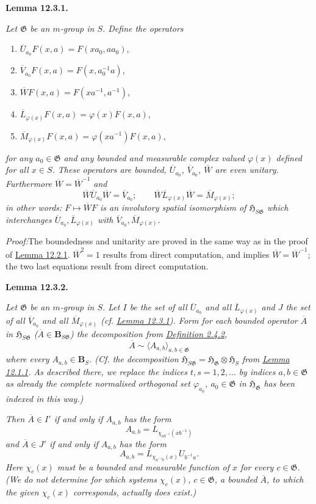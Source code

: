 \documentclass[12pt,b5paper,twoside]{article}
\newcommand{\Hspace}{\mathfrak H}
\newcommand{\B}{\mathbf B}
\newcommand{\Lemma}[1]{%
  \par\smallskip\noindent\phantomsection\label{lem:#1}\textbf{Lemma #1.}\enspace
}
\newcommand{\Proof}{\par\noindent\textit{Proof:}\enspace}
\newcommand{\defref}[1]{\hyperref[def:#1]{Definition #1}}
\newcommand{\lemref}[1]{\hyperref[lem:#1]{Lemma #1}}
\begin{document}
\Lemma{12.3.1}
\emph{Let $\mathfrak G$ be an $m$-group in $S$. Define the operators}
\begin{enumerate}[label=(\roman*)]
\item $\overline U_{a_0}F(x,a)=F(xa_0,aa_0)$,
\item $\overline V_{a_0}F(x,a)=F(x,a_0^{-1}a)$,
\item $\overline WF(x,a)=F(xa^{-1},a^{-1})$,
\item $\overline L_{\varphi(x)}F(x,a)=\varphi(x)F(x,a)$,
\item $\overline M_{\varphi(x)}F(x,a)=\varphi(xa^{-1})F(x,a)$,
\end{enumerate}
\emph{for any $a_0\in\mathfrak G$ and any bounded and measurable complex
valued $\varphi(x)$ defined for all $x\in S$. These operators are bounded,
$\overline U_{a_0}$, $\overline V_{a_0}$, $\overline W$ are even unitary.
Furthermore $\overline W=\overline W^{-1}$ and}
\[
 \overline W\overline U_{a_0}\overline W=\overline V_{a_0};
 \qquad
 \overline W\overline L_{\varphi(x)}\overline W
 =\overline M_{\varphi(x)};
\]
\emph{in other words: $F\mapsto\overline WF$ is an involutory spatial
isomorphism of $\Hspace_{S\mathfrak G}$ which interchanges
$\overline U_{a_0},\overline L_{\varphi(x)}$ with
$\overline V_{a_0},\overline M_{\varphi(x)}$.}

\Proof The boundedness and unitarity are proved in the same way as in the
proof of \lemref{12.2.1}. $\overline W^2=1$ results from direct computation,
and implies $\overline W=\overline W^{-1}$; the two last equations result from
direct computation.

\Lemma{12.3.2}
\emph{Let $\mathfrak G$ be an $m$-group in $S$. Let $I$ be the set of all
$\overline U_{a_0}$ and all $\overline L_{\varphi(x)}$ and $J$ the set of all
$\overline V_{a_0}$ and all $\overline M_{\varphi(x)}$
(cf. \lemref{12.3.1}). Form for each bounded operator $\overline A$ in
$\Hspace_{S\mathfrak G}$ ($\overline A\in\B_{S\mathfrak G}$) the decomposition from
\defref{2.4.2},}
\[
 \overline A\sim\langle A_{a,b}\rangle_{a,b\in\mathfrak G}
\]
\emph{where every $A_{a,b}\in\B_S$. (Cf. the decomposition
$\Hspace_{S\mathfrak G}=\Hspace_{\mathfrak G}\otimes\Hspace_S$ from
\lemref{12.1.1}. As described there, we replace the indices
$t,s=1,2,\ldots$ by indices $a,b\in\mathfrak G$ as already the complete
normalised orthogonal set $\varphi_{a_0}$, $a_0\in\mathfrak G$ in
$\Hspace_{\mathfrak G}$ has been indexed in this way.)}

\emph{Then $\overline A\in I'$ if and only if $A_{a,b}$ has the form}
\[
 A_{a,b}=L_{\chi_{ab^{-1}}(xb^{-1})}
\]
\emph{and $\overline A\in J'$ if and only if $A_{a,b}$ has the form}
\[
 A_{a,b}=L_{\chi_{a^{-1}b}(x)}U_{b^{-1}a}.
\]
\emph{Here $\chi_c(x)$ must be a bounded and measurable function of $x$ for
every $c\in\mathfrak G$. (We do not determine for which systems
$\chi_c(x)$, $c\in\mathfrak G$, a bounded $\overline A$, to which the given
$\chi_c(x)$ corresponds, actually does exist.)}
\end{document}
